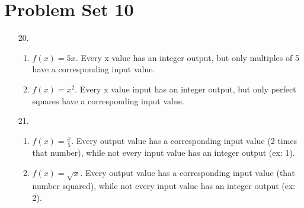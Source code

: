 \documentclass[12pt]{article}
\begin{document}
\section*{Problem Set 10}
\begin{itemize}
    \item [20.]
        \begin{enumerate}
            \item
                $f(x) = 5x$. Every x value has an integer output, but only multiples of 5
                have a corresponding input value.
            \item 
                $f(x) = x^2$. Every x value input has an integer output, but only perfect squares
                have a corresponding input value.
        \end{enumerate}

    \item [21.]
        \begin{enumerate}
            \item 
                $f(x) = \frac{x}{5}$. Every output value has a corresponding input value (2
                times that number), while not every input value has an integer output (ex: 1).
            \item 
                $f(x) = \sqrt{x}$. Every output value has a corresponding input value (that
                number squared), while not every input value has an integer output (ex: 2).
        \end{enumerate}

\end{itemize}
\end{document}
